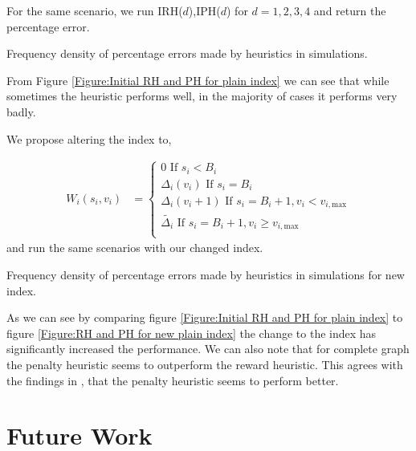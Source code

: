 \documentclass[a4paper,10pt]{article}
\theoremstyle{definition}
\theoremstyle{definition}
\theoremstyle{remark}
\theoremstyle{definition}
\begin{document}
For the same scenario, we run IRH($d$),IPH($d$) for $d=1,2,3,4$ and return the percentage error.

\begin{myfigure}
\begin{center}

\end{center}
\caption{Frequency density of percentage errors made by heuristics in simulations.}
\label{Figure:Initial RH and PH for plain index}
\end{myfigure}

From Figure \ref{Figure:Initial RH and PH for plain index} we can see that while sometimes the heuristic performs well, in the majority of cases it performs very badly.

We propose altering the index to,

\begin{align}
W_{i}(s_{i},v_{i})&=\begin{cases}
0 \text{ If } s_{i}<B_{i} \\
\Delta_{i}(v_{i}) \text{ If } s_{i}=B_{i} \\
\Delta_{i}(v_{i}+1) \text{ If } s_{i}=B_{i}+1 , v_{i} < v_{i,\text{max}} \\
\widetilde{\Delta_{i}} \text{ If } s_{i}=B_{i}+1, v_{i} \geq v_{i,\text{max}} \\
\end{cases}
\end{align}
and run the same scenarios with our changed index.

\begin{myfigure}
\begin{center}

\end{center}
\caption{Frequency density of percentage errors made by heuristics in simulations for new index.}
\label{Figure:RH and PH for new plain index}
\end{myfigure}

As we can see by comparing figure \ref{Figure:Initial RH and PH for plain index} to figure \ref{Figure:RH and PH for new plain index} the change to the index has significantly increased the performance. We can also note that for complete graph the penalty heuristic seems to outperform the reward heuristic. This agrees with the findings in \cite{Lin2013}, that the penalty heuristic seems to perform better.

\section{Future Work}
\label{Section:Future Work}
\end{document}
